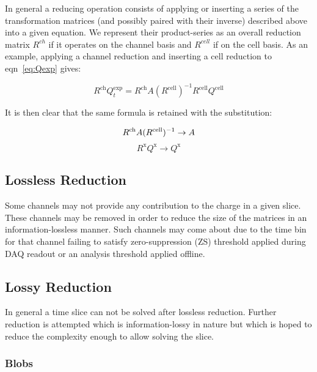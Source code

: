 \documentclass[letter]{article}
\begin{document}
In general a reducing operation consists of applying or inserting a
series of the transformation matrices (and possibly paired with their
inverse) described above into a given equation.
We represent their product-series as an overall reduction matrix
$R^{ch}$ if it operates on the channel basis and $R^{cell}$ if on the
cell basis.
As an example, applying a channel reduction and inserting a cell
reduction to eqn~\ref{eq:Qexp} gives:

\begin{equation}
  \label{eq:contraction}
  R^\mathrm{ch} Q^\mathrm{exp}_t = 
R^\mathrm{ch} 
A (R^\mathrm{cell})^{-1} 
R^\mathrm{cell}  
Q^\mathrm{cell}
\end{equation}

\noindent It is then clear that the same formula is retained with the
substitution:

\begin{equation}
  \label{eq:subst}
  R^\mathrm{ch} A (R^\mathrm{cell})^{-1} \to A\\
\end{equation}
\begin{equation}
  \label{eq:subst2}
  R^\mathrm{x} Q^\mathrm{x} \to Q^\mathrm{x}
\end{equation}

\subsection{Lossless Reduction}

Some channels may not provide any contribution to the charge in a
given slice.
These channels may be removed in order to reduce the size of the
matrices in an information-lossless manner.
Such channels may come about due to the time bin for that channel failing to
satisfy zero-suppression (ZS) threshold applied during DAQ readout or
an analysis threshold applied offline.

\subsection{Lossy Reduction}

In general a time slice can not be solved after lossless reduction.  Further
reduction is attempted which is information-lossy in nature but which
is hoped to reduce the complexity enough to allow solving the slice. 


\subsubsection{Blobs}
\end{document}
